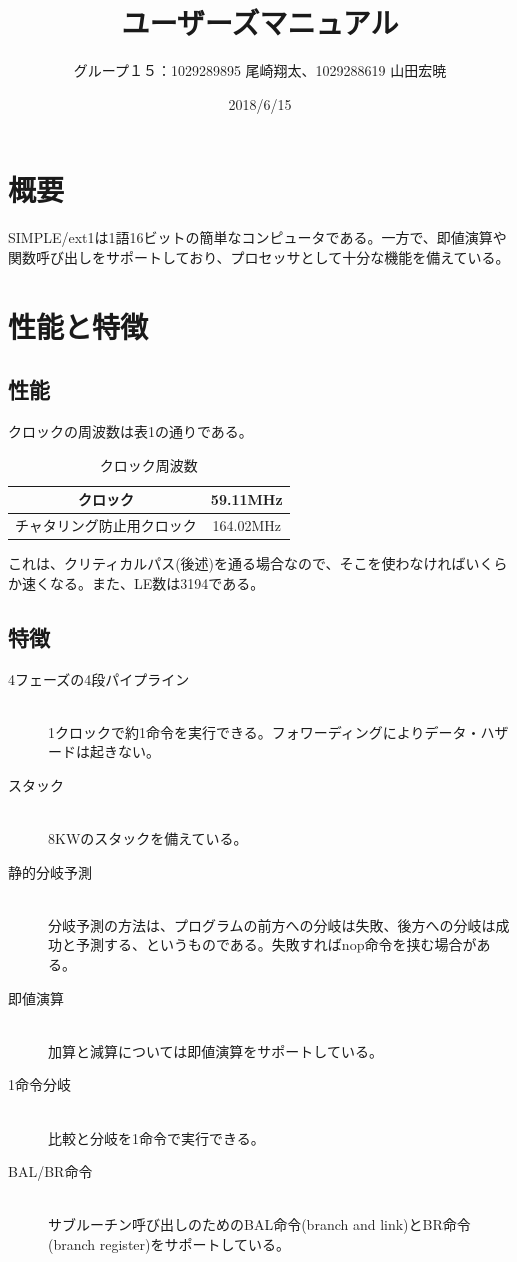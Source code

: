 \documentclass{jarticle}
\begin{document}
\begin{titlepage}
\title{ユーザーズマニュアル}
\author{グループ１５：1029289895 尾崎翔太、1029288619 山田宏暁}
\date{2018/6/15}

\maketitle
\end{titlepage}

\section{概要}
\hspace{10pt}SIMPLE/ext1は1語16ビットの簡単なコンピュータである。一方で、即値演算や関数呼び出しをサポートしており、プロセッサとして十分な機能を備えている。


\section{性能と特徴}
\subsection{性能}
\hspace{10pt}クロックの周波数は表1の通りである。
\begin{table}[htbp]
  \centering
  \caption{クロック周波数}
  \begin{tabular}{|c|c|} \hline
  クロック & 59.11MHz \\ \hline
  チャタリング防止用クロック & 164.02MHz \\ \hline
  \end{tabular}
\end{table}
これは、クリティカルパス(後述)を通る場合なので、そこを使わなければいくらか速くなる。また、LE数は3194である。

\subsection{特徴}
\begin{description}
\item[4フェーズの4段パイプライン] \leavevmode \\
1クロックで約1命令を実行できる。フォワーディングによりデータ・ハザードは起きない。
\item[スタック] \leavevmode \\
8KWのスタックを備えている。
\item[静的分岐予測] \leavevmode \\
分岐予測の方法は、プログラムの前方への分岐は失敗、後方への分岐は成功と予測する、というものである。失敗すればnop命令を挟む場合がある。
\item[即値演算] \leavevmode \\
加算と減算については即値演算をサポートしている。
\item[1命令分岐] \leavevmode \\
比較と分岐を1命令で実行できる。
\item[BAL/BR命令] \leavevmode \\
サブルーチン呼び出しのためのBAL命令(branch and link)とBR命令(branch register)をサポートしている。
\end{description}
\end{document}
